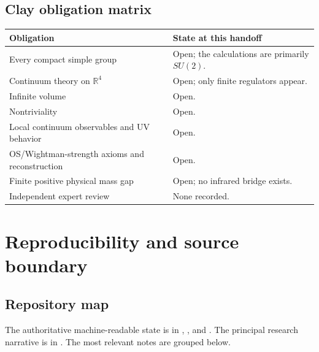 \documentclass[11pt]{article}
\theoremstyle{definition}
\begin{document}
\subsection{Clay obligation matrix}

\begin{center}
\begin{tabularx}{\textwidth}{>{\raggedright\arraybackslash}p{}
                             >{\raggedright\arraybackslash}X}
\toprule
\textbf{Obligation} & \textbf{State at this handoff} \\
\midrule
Every compact simple group & Open; the calculations are primarily \(SU(2)\). \\
Continuum theory on \(\mathbb R^4\) & Open; only finite regulators appear. \\
Infinite volume & Open. \\
Nontriviality & Open. \\
Local continuum observables and UV behavior & Open. \\
OS/Wightman-strength axioms and reconstruction & Open. \\
Finite positive physical mass gap & Open; no infrared bridge exists. \\
Independent expert review & None recorded. \\
\bottomrule
\end{tabularx}
\end{center}

\section{Reproducibility and source boundary}

\subsection{Repository map}

The authoritative machine-readable state is in
, , and
.  The principal research narrative is in
.  The most relevant notes are grouped below.
\end{document}
